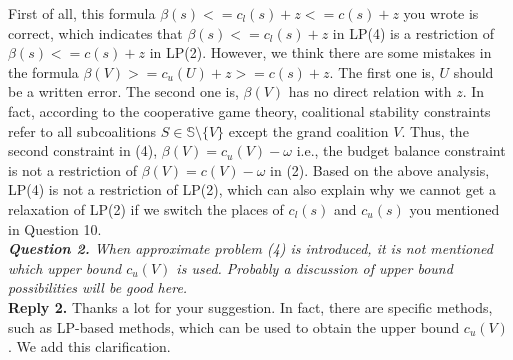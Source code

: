 \documentclass[11pt]{article}
\begin{document}
First of all, this formula $\beta(s) <= c_l(s) + z <= c(s) + z$ you wrote is correct, which indicates that $\beta(s) <= c_l(s) + z$ in LP(4) is a restriction of $\beta(s) <= c(s) + z$ in LP(2).
However, we think there are some mistakes in the formula $\beta(V) >= c_u(U) + z >= c(s) + z$. The first one is, $U$ should be a written error. The second one is, $\beta(V)$ has no direct relation with $z$.
In fact, according to the cooperative game theory, coalitional stability constraints refer to all subcoalitions $S \in \mathbb{S} \setminus \big\{V\big\}$ except the grand coalition $V$.
Thus, the second constraint in (4), $\beta(V)=c_u(V)-\omega$ i.e., the budget balance constraint is not a restriction of $\beta(V)=c(V)-\omega$ in (2).
Based on the above analysis, LP(4) is not a restriction of LP(2), which can also explain why we cannot get a relaxation of LP(2) if we switch the places of $c_l(s)$ and $c_u(s)$ you mentioned in Question 10.
\\[4mm]
%
%
%
\noindent \textit{\textbf{Question 2.}
When approximate problem (4) is introduced, it is not mentioned which upper bound $c_u(V)$ is used. Probably a discussion of upper bound possibilities will be good here.}
\\[2mm]
\noindent \textbf{Reply 2.}
Thanks a lot for your suggestion.
In fact, there are specific methods, such as LP-based methods, which can be used to obtain the upper bound $c_u(V)$. We add this clarification.

\end{document}
